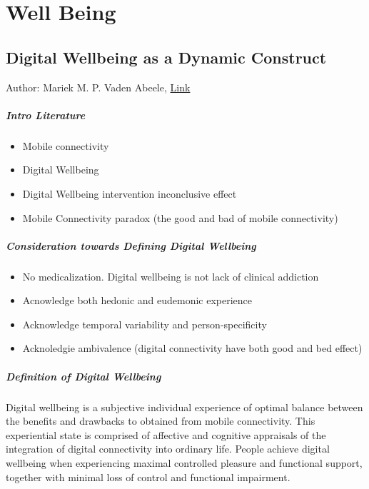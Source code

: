 \chapter{Well Being}

\section{Digital Wellbeing as a Dynamic Construct} 
Author: Mariek M. P. Vaden Abeele, \href{https://academic.oup.com/ct/article/31/4/932/5927565}{Link} 

\paragraph{Intro Literature}
    \begin{itemize}
        \item Mobile connectivity
        \item Digital Wellbeing 
        \item Digital Wellbeing intervention inconclusive effect
        \item Mobile Connectivity paradox (the good and bad of mobile connectivity) 
    \end{itemize}

\paragraph{Consideration towards Defining Digital Wellbeing}
    \begin{itemize}
        \item No medicalization. Digital wellbeing is not lack of clinical addiction  
        \item Acnowledge both hedonic and eudemonic experience 
        \item Acknowledge temporal variability and person-specificity
        \item Acknoledgie ambivalence (digital connectivity have both good and bed effect)
    \end{itemize}

\paragraph{Definition of Digital Wellbeing}
Digital wellbeing is a subjective individual experience of optimal balance between the benefits and drawbacks to obtained from mobile connectivity. This experiential state is comprised of affective and cognitive appraisals of the integration of digital connectivity into ordinary life. People achieve digital wellbeing when experiencing maximal controlled pleasure and functional support, together with minimal loss of control and functional impairment. 

